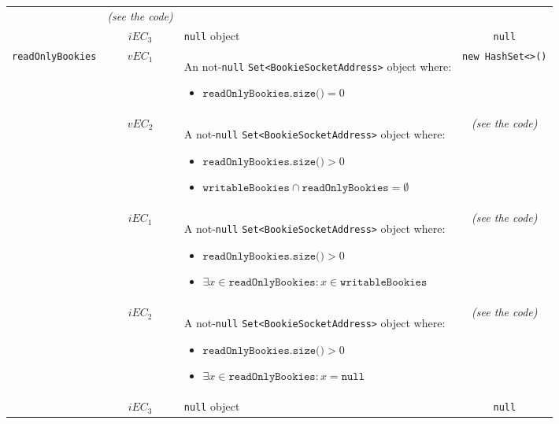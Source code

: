 \documentclass[sigconf]{acmart}
\begin{document}
\begin{table*}
\begin{tabular}{l|cm{10.5cm}|c}
& \textit{(see the code)}

\\\cline{2-4}

& $iEC_3$ & \texttt{null} object & \texttt{null}

\\\hline

\texttt{readOnlyBookies} & $vEC_1$ & An not-\texttt{null} \texttt{Set<BookieSocketAddress>} object where:

\begin{itemize}
\item $\texttt{readOnlyBookies.size()} = 0$
\end{itemize}

& \texttt{new HashSet<>()}

\\\cline{2-4}

& $vEC_2$ & A not-\texttt{null} \texttt{Set<BookieSocketAddress>} object where:
\begin{itemize}
\item $\texttt{readOnlyBookies.size()} > 0$
\item $\texttt{writableBookies}  \cap \texttt{readOnlyBookies} = \emptyset$
\end{itemize}

& \textit{(see the code)}

\\\cline{2-4}

& $iEC_1$ & A not-\texttt{null} \texttt{Set<BookieSocketAddress>} object where:
\begin{itemize}
\item $\texttt{readOnlyBookies.size()} > 0$
\item $\exists x \in \texttt{readOnlyBookies} : x \in \texttt{writableBookies}$
\end{itemize}

& \textit{(see the code)}

\\\cline{2-4}

& $iEC_2$ & A not-\texttt{null} \texttt{Set<BookieSocketAddress>} object where:
\begin{itemize}
\item $\texttt{readOnlyBookies.size()} > 0$
\item $\exists x \in \texttt{readOnlyBookies} : x = \texttt{null}$
\end{itemize}

& \textit{(see the code)}

\\\cline{2-4}

& $iEC_3$ & \texttt{null} object & \texttt{null}

\\

\bottomrule
\end{tabular}
\end{table*}
\end{document}
